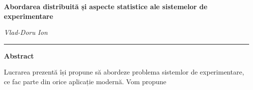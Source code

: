 \thispagestyle{plain}
\begin{center}
	\Large
	\textbf{Abordarea distribuită și aspecte statistice ale sistemelor de experimentare}
	
	\vspace{0.4cm}
	\large
	\textit{Vlad-Doru Ion}
	
	\rule{\textwidth}{1pt}
	
	\vspace{0.9cm}
	\Large \textbf{Abstract}
	
\end{center}

Lucrarea prezentă își propune să abordeze problema sistemlor de experimentare, ce fac parte din orice aplicație modernă. Vom propune 